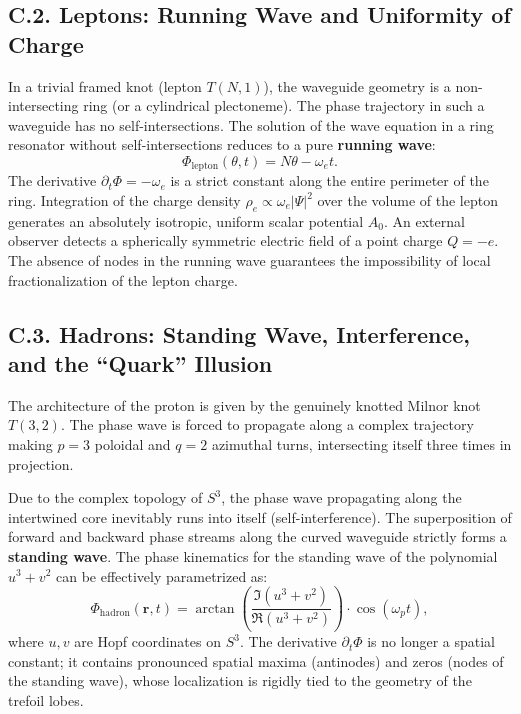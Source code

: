 \documentclass[11pt,a4paper]{article}
\begin{document}
\subsection*{C.2. Leptons: Running Wave and Uniformity of Charge}
In a trivial framed knot (lepton $T(N,1)$), the waveguide geometry is a non-intersecting ring (or a cylindrical plectoneme). The phase trajectory in such a waveguide has no self-intersections.
The solution of the wave equation in a ring resonator without self-intersections reduces to a pure \textbf{running wave}:
\begin{equation}
\Phi_{\text{lepton}}(\theta, t) = N\theta - \omega_e t.
\end{equation}
The derivative $\partial_t \Phi = -\omega_e$ is a strict constant along the entire perimeter of the ring.
Integration of the charge density $\rho_e \propto \omega_e |\Psi|^2$ over the volume of the lepton generates an absolutely isotropic, uniform scalar potential $A_0$. An external observer detects a spherically symmetric electric field of a point charge $Q = -e$. The absence of nodes in the running wave guarantees the impossibility of local fractionalization of the lepton charge.

\subsection*{C.3. Hadrons: Standing Wave, Interference, and the ``Quark'' Illusion}
The architecture of the proton is given by the genuinely knotted Milnor knot $T(3,2)$. The phase wave is forced to propagate along a complex trajectory making $p=3$ poloidal and $q=2$ azimuthal turns, intersecting itself three times in projection.

Due to the complex topology of $S^3$, the phase wave propagating along the intertwined core inevitably runs into itself (self-interference). The superposition of forward and backward phase streams along the curved waveguide strictly forms a \textbf{standing wave}. The phase kinematics for the standing wave of the polynomial $u^3 + v^2$ can be effectively parametrized as:
\begin{equation}
\Phi_{\text{hadron}}(\mathbf{r}, t) = \arctan\!\left(\frac{\Im(u^3 + v^2)}{\Re(u^3 + v^2)}\right) \cdot \cos(\omega_p t),
\end{equation}
where $u, v$ are Hopf coordinates on $S^3$. The derivative $\partial_t \Phi$ is no longer a spatial constant; it contains pronounced spatial maxima (antinodes) and zeros (nodes of the standing wave), whose localization is rigidly tied to the geometry of the trefoil lobes.
\end{document}
